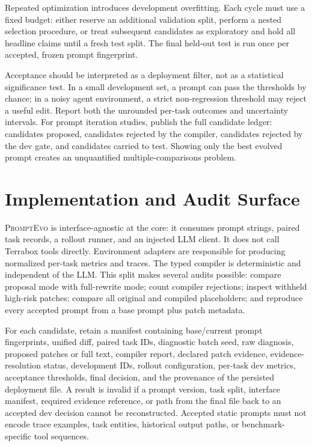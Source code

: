 \documentclass[10pt]{article}
\newcommand{\method}{\textsc{PromptEvo}}
\begin{document}
Repeated optimization introduces development overfitting. Each cycle must use a fixed budget: either reserve an additional validation split, perform a nested selection procedure, or treat subsequent candidates as exploratory and hold all headline claims until a fresh test split. The final held-out test is run once per accepted, frozen prompt fingerprint.

Acceptance should be interpreted as a deployment filter, not as a statistical significance test. In a small development set, a prompt can pass the thresholds by chance; in a noisy agent environment, a strict non-regression threshold may reject a useful edit. Report both the unrounded per-task outcomes and uncertainty intervals. For prompt iteration studies, publish the full candidate ledger: candidates proposed, candidates rejected by the compiler, candidates rejected by the dev gate, and candidates carried to test. Showing only the best evolved prompt creates an unquantified multiple-comparisons problem.

\section{Implementation and Audit Surface}
\method{} is interface-agnostic at the core: it consumes prompt strings, paired task records, a rollout runner, and an injected LLM client. It does not call Terrabox tools directly. Environment adapters are responsible for producing normalized per-task metrics and traces. The typed compiler is deterministic and independent of the LLM. This split makes several audits possible: compare proposal mode with full-rewrite mode; count compiler rejections; inspect withheld high-risk patches; compare all original and compiled placeholders; and reproduce every accepted prompt from a base prompt plus patch metadata.

For each candidate, retain a manifest containing base/current prompt fingerprints, unified diff, paired task IDs, diagnostic batch seed, raw diagnosis, proposed patches or full text, compiler report, declared patch evidence, evidence-resolution status, development IDs, rollout configuration, per-task dev metrics, acceptance thresholds, final decision, and the provenance of the persisted deployment file. A result is invalid if a prompt version, task split, interface manifest, required evidence reference, or path from the final file back to an accepted dev decision cannot be reconstructed. Accepted static prompts must not encode trace examples, task entities, historical output paths, or benchmark-specific tool sequences.
\end{document}
